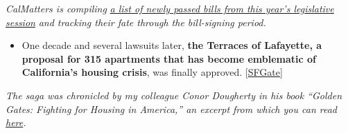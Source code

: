 \emph{CalMatters is compiling}
\href{https://calmatters.org/explainers/california-final-bill-tracker-2020-legislature/?_gl=1*qxjqja*_ga*MjU4NzQwMjcxLjE1NTMyODIyNTA.}{\emph{a
list of newly passed bills from this year's legislative session}}
\emph{and tracking their fate through the bill-signing period.}

\begin{itemize}
\tightlist
\item
  One decade and several lawsuits later, \textbf{the Terraces of
  Lafayette, a proposal for 315 apartments that has become emblematic of
  California's housing crisis}, was finally approved.
  {[}\href{https://www.sfgate.com/news/bayarea/article/Controversial-Terraces-Apartments-Approved-15512253.php}{SFGate}{]}
\end{itemize}

\emph{The saga was chronicled by my colleague Conor Dougherty in his
book ``Golden Gates: Fighting for Housing in America,'' an excerpt from
which you can read}
\href{https://www.nytimes3xbfgragh.onion/2020/02/13/business/economy/housing-crisis-conor-dougherty-golden-gates.html}{\emph{here}}\emph{.}

